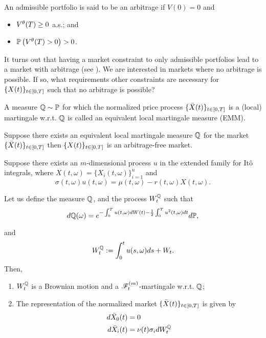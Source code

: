 \documentclass[../TGMAFFIRO.tex]{subfiles}
\begin{document}
\begin{definition}
	An admissible portfolio is said to be an arbitrage if $V(0) = 0$ and
	\begin{itemize}
		\item $V^\theta(T) \geq 0$ a.s.; and
		\item $\mathbb{P}\left(V^\theta(T) > 0 \right) > 0$.
	\end{itemize}
\end{definition}

It turns out that having a market constraint to only admissible portfolios lead to a market with arbitrage (see ). We are interested in markets where no arbitrage is possible. If so, what requirements other constraints are necessary for $\{X(t)\}_{t\in[0,T]}$ such that no arbitrage is possible?

\begin{definition}
	A measure $\mathbb{Q} \sim \mathbb{P}$ for which the normalized price process $\{\bar{X}(t)\}_{t\in[0,T]}$ is a (local) martingale w.r.t. $\mathbb{Q}$ is called an equivalent local martingale measure (EMM).
\end{definition}

\begin{proposition}
	Suppose there exists an equivalent local martingale measure $\mathbb{Q}$ for the market $\{\bar{X}(t)\}_{t\in[0,T]}$ then $\{X(t)\}_{t\in[0,T]}$ is an arbitrage-free market.
\end{proposition}

\begin{proposition}\label{prop:qmartingale-market}
	Suppose there exists an $m$-dimensional process $u$ in the extended family for It\^o integrals, where $X(t, \omega) = \{X_i(t,\omega)\}_{i=1}^n$ and
	\begin{equation}
		\sigma(t,\omega)u(t,\omega) = \mu(t, \omega) - r(t, \omega)X(t,\omega).
	\end{equation}

Let us define the measure $\mathbb{Q}$, and the process $W^{\mathbb{Q}}_t$ such that
\[
	d\mathbb{Q}(\omega) = e^{-\int_0^Tu(t,\omega) dW(t) - \frac{1}{2}\int_0^Tu^2(t,\omega) dt}d\mathbb{P},
\]

and
\[
	W^{\mathbb{Q}}_t := \int_0^tu(s,\omega) ds + W_t.
\]
Then,
\begin{enumerate}
	\item $W^{\mathbb{Q}}_t$ is a Brownian motion and a $\mathscr{F}_t^{(m)}$-martingale w.r.t. $\mathbb{Q}$;
	\item The representation of the normalized market $\{\bar{X}(t)\}_{t\in[0,T]}$ is given by
	\begin{align*}
		d\bar{X}_0(t) &= 0 \\
		d\bar{X}_i(t) &= \nu(t)\sigma_i dW^{\mathbb{Q}}_t
	\end{align*}
\end{enumerate}
\end{proposition}
\end{document}
